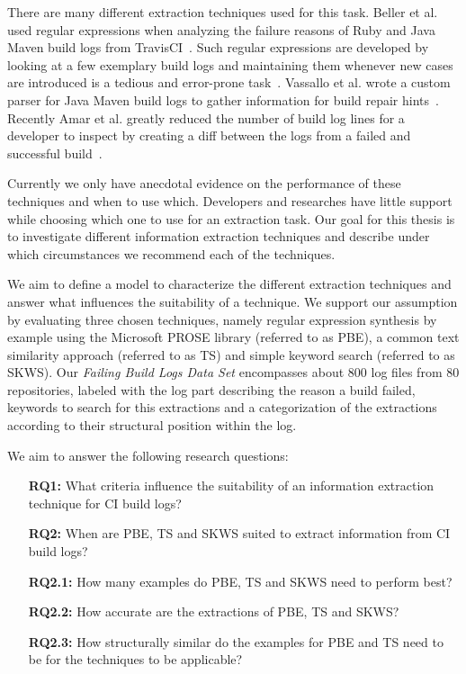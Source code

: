 \documentclass[\myrootdir/main.tex]{subfiles}
\begin{document}
There are many different extraction techniques used for this task. Beller et al. used regular expressions when analyzing the failure reasons of Ruby and Java Maven build logs from TravisCI~\cite{beller2017oops}. Such regular expressions are developed by looking at a few exemplary build logs and maintaining them whenever new cases are introduced is a tedious and error-prone task~\cite{michael2019regexes}.
Vassallo et al. wrote a custom parser for Java Maven build logs to gather information for build repair hints~\cite{vassallo2018un-break}.
Recently Amar et al. greatly reduced the number of build log lines for a developer to inspect by creating a diff between the logs from a failed and successful build~\cite{amar2019mining}.

Currently we only have anecdotal evidence on the performance of these techniques and when to use which. Developers and researches have little support while choosing which one to use for an extraction task. Our goal for this thesis is to investigate different information extraction techniques and describe under which circumstances we recommend each of the techniques.

We aim to define a model to characterize the different extraction techniques and answer what influences the suitability of a technique.
We support our assumption by evaluating three chosen techniques, namely regular expression synthesis by example using the Microsoft PROSE library (referred to as PBE), a common text similarity approach (referred to as TS) and simple keyword search (referred to as SKWS).
Our \emph{Failing Build Logs Data Set} encompasses about 800 log files from 80 repositories, labeled with the log part describing the reason a build failed, keywords to search for this extractions and a categorization of the extractions according to their structural position within the log. 


We aim to answer the following research questions:
\begin{itemize}
  \item[\textbf{RQ1:}] What criteria influence the suitability of an information extraction technique for CI build logs?
  \item[\textbf{RQ2:}] When are PBE, TS and SKWS suited to extract information from CI build logs?
  \item[\textbf{RQ2.1:}] How many examples do PBE, TS and SKWS need to perform best?
  \item[\textbf{RQ2.2:}] How accurate are the extractions of PBE, TS and SKWS?
  \item[\textbf{RQ2.3:}] How structurally similar do the examples for PBE and TS need to be for the techniques to be applicable?
\end{itemize}
\end{document}
